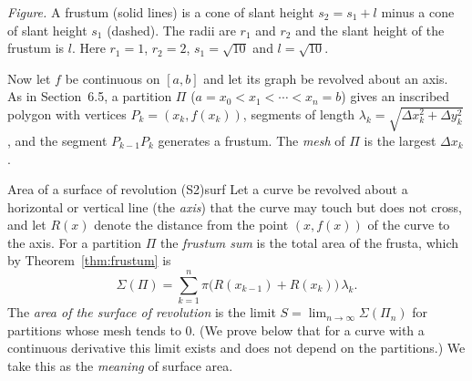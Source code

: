 \documentclass[11pt]{article}
\begin{document}
\begin{center}
\par\small\emph{Figure.} A frustum (solid lines) is a cone of slant height $s_2=s_1+l$ minus a cone of slant height $s_1$ (dashed). The radii are $r_1$ and $r_2$ and the slant height of the frustum is $l$. Here $r_1=1$, $r_2=2$, $s_1=\sqrt{10}$ and $l=\sqrt{10}$.
\end{center}

Now let $f$ be continuous on $[a,b]$ and let its graph be revolved about an axis. As in Section~6.5, a partition $\Pi$ ($a=x_0<x_1<\cdots<x_n=b$) gives an inscribed polygon with vertices $P_k=(x_k,f(x_k))$, segments of length $\lambda_k=\sqrt{\Delta x_k^2+\Delta y_k^2}$, and the segment $P_{k-1}P_k$ generates a frustum. The \emph{mesh} of $\Pi$ is the largest $\Delta x_k$.

\begin{defn}{Area of a surface of revolution (S2)}{surf}
Let a curve be revolved about a horizontal or vertical line (the \emph{axis}) that the curve may touch but does not cross, and let $R(x)$ denote the distance from the point $(x,f(x))$ of the curve to the axis. For a partition $\Pi$ the \emph{frustum sum} is the total area of the frusta, which by Theorem~\ref{thm:frustum} is
\[
\Sigma(\Pi)=\sum_{k=1}^n\pi\bigl(R(x_{k-1})+R(x_k)\bigr)\,\lambda_k .
\]
The \emph{area of the surface of revolution} is the limit $S=\lim_{n\to\infty}\Sigma(\Pi_n)$ for partitions whose mesh tends to $0$. (We prove below that for a curve with a continuous derivative this limit exists and does not depend on the partitions.) We take this as the \emph{meaning} of surface area.
\end{defn}
\end{document}
